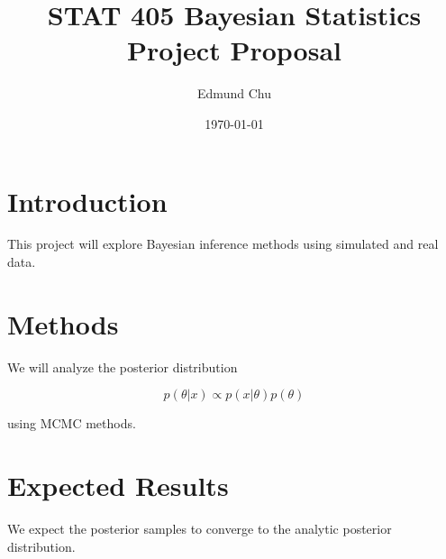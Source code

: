 \documentclass{article}
\title{STAT 405 Bayesian Statistics Project Proposal}
\author{Edmund Chu}
\date{\today}
\begin{document}
\maketitle

\section{Introduction}

This project will explore Bayesian inference methods using simulated and real data.

\section{Methods}

We will analyze the posterior distribution

\[
p(\theta | x) \propto p(x | \theta) p(\theta)
\]

using MCMC methods.

\section{Expected Results}

We expect the posterior samples to converge to the analytic posterior distribution.
\end{document}
